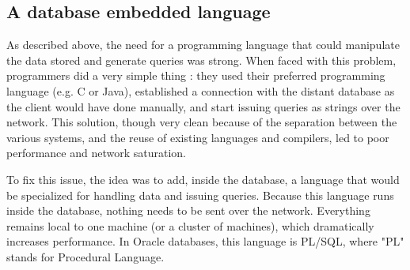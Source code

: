 \documentclass[twoside,11pt,a4paper]{article}
\begin{document}
\subsection{A database embedded language}

As described above, the need for a programming language that could manipulate the data stored and generate queries was strong. When faced with this problem, programmers did a very simple thing : they used their preferred programming language (e.g. C or Java), established a connection with the distant database as the client would have done manually, and start issuing queries as strings over the network. This solution, though very clean because of the separation between the various systems, and the reuse of existing languages and compilers, led to poor performance and network saturation.



To fix this issue, the idea was to add, inside the database, a language that would be specialized for handling data and issuing queries. Because this language runs inside the database, nothing needs to be sent over the network. Everything remains local to one  machine (or a cluster of machines), which dramatically increases performance. In Oracle databases, this language is PL/SQL, where "PL" stands for Procedural Language.
\end{document}
